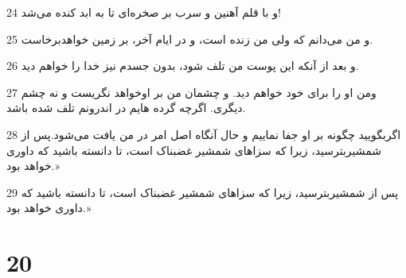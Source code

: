 \par 24 و با قلم آهنین و سرب بر صخره‌ای تا به ابد کنده می‌شد!
\par 25 و من می‌دانم که ولی من زنده است، و در ایام آخر، بر زمین خواهدبرخاست.
\par 26 و بعد از آنکه این پوست من تلف شود، بدون جسدم نیز خدا را خواهم دید.
\par 27 ومن او را برای خود خواهم دید. و چشمان من بر اوخواهد نگریست و نه چشم دیگری. اگر‌چه گرده هایم در اندرونم تلف شده باشد.
\par 28 اگربگویید چگونه بر او جفا نماییم و حال آنگاه اصل امر در من یافت می‌شود.پس از شمشیربترسید، زیرا که سزاهای شمشیر غضبناک است، تا دانسته باشید که داوری خواهد بود.»
\par 29 پس از شمشیربترسید، زیرا که سزاهای شمشیر غضبناک است، تا دانسته باشید که داوری خواهد بود.»
 
\chapter{20}

